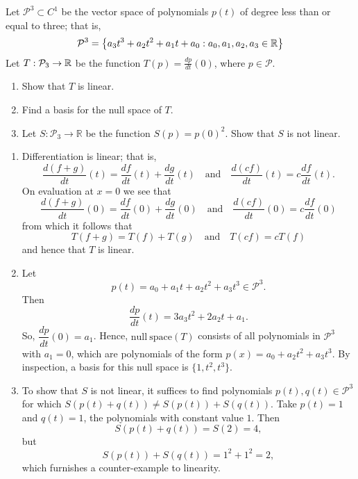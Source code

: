 \documentclass{ximera}
\author{Matthew Carr \& Marty Golubitsky}
\begin{document}
\begin{exercise}\label{mc.exerciseErr1}

Let $\mathcal{P}^3\subset C^1$ be the vector space of polynomials $p(t)$ of degree less than or equal to three; that is,
\[
\mathcal{P}^3=\left\{a_3 t^3 + a_2 t^2 + a_1 t + a_0 : a_0,a_1,a_2, a_3\in \mbox{$\Bbb{R}$}\right\}
\]
Let $T:\mathcal{P}_3\rightarrow \mbox{$\Bbb{R}$}$ be the function $T(p) = \frac{dp}{dt}(0)$, where $p\in\mathcal{P}$.
\begin{enumerate}[label=(\alph*)]
\item Show that $T$ is linear.
\item  Find a basis for the null space of $T$.
\item Let  $S:\mathcal{P}_3\rightarrow \mathbb{R}$ be the function $S(p)=p(0)^2$.  Show that $S$ is not linear.
\end{enumerate}

  
\begin{solution}

\soln  
\begin{enumerate}[label=(\alph*)]
\item Differentiation is linear; that is, 
\[
\dfrac{d(f+g)}{dt}(t) = \dfrac{df}{dt}(t)+\dfrac{dg}{dt}(t) \quad \mbox{and} \quad 
\dfrac{d(cf)}{dt}(t) = c\dfrac{df}{dt}(t).
\]
On evaluation at $x=0$ we see that 
\[
\dfrac{d(f+g)}{dt}(0) = \dfrac{df}{dt}(0)+\dfrac{dg}{dt}(0) \quad \mbox{and} \quad 
\dfrac{d(cf)}{dt}(0) = c\dfrac{df}{dt}(0)
\]
from which it follows that
\[
T(f+g) = T(f) + T(g)  \quad \mbox{and} \quad  T(cf) = cT(f)
\]
and hence that $T$ is linear.
\item Let 
\[
p(t)=a_0+a_1t+a_2 t^2+a_3 t^3 \in \mathcal{P}^3.
\]
Then
 \[
 \dfrac{dp}{dt}(t)=3a_3t^2+2a_2 t+a_1.
 \]
So, $\dfrac{dp}{dt}(0)=a_1$. Hence, $\mathrm{null\ space}(T)$ consists of all polynomials in $\mathcal{P}^3$ with $a_1=0$, which are polynomials of the form $p(x)=a_0+a_2 t^2+a_3 t^3$. By inspection, a basis for this null space is $\{1,t^2,t^3\}$.
\item To show that $S$ is not linear, it suffices to find polynomials $p(t),q(t)\in\mathcal{P}^3$ for which $S(p(t)+q(t))\ne S(p(t))+S(q(t))$. Take $p(t)=1$ and $q(t)=1$, the polynomials with constant value $1$.  Then 
\[
S(p(t)+q(t)) = S(2) =4,
\]
but
\[
S(p(t))+S(q(t)) = 1^2+1^2 = 2,
\]
which furnishes a counter-example to linearity.
\end{enumerate}
\end{solution}
\end{exercise}
\end{document}
